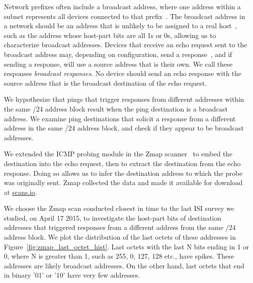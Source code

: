 Network prefixes often include a broadcast address, where one
address within a subnet represents all devices connected to
that prefix~\cite{rfc919}.
%
The broadcast address in a network should
be an address that is
unlikely to be assigned to a real host~\cite{rfc919}, such as the
address whose host-part bits are all 1s or 0s, allowing us to
characterize broadcast addresses.
%
Devices that receive an echo
request sent to the broadcast address may, depending on
configuration, send a response~\cite{rfc1122}, and if sending a response,
will use a source address that is their own.
%
We call these
responses \emph{broadcast responses}.  
%
No device should send
an echo response with the source address that is the
broadcast destination of the echo request. 

We hypothesize that pings that trigger responses from different
addresses within the same /24 address block result when the
ping destination is a broadcast address. 
We examine ping destinations
that solicit a response from a different address in the same /24
address block, and check if they appear to be broadcast addresses.
%
%
%
%

We extended the ICMP probing module in the
Zmap scanner~\cite{durumeric2013zmap} to embed the destination
into the echo request, then to extract the destination from the
echo response.
%
Doing so allows us to infer the destination address to which the probe
was originally sent.
%
%
Zmap collected the data and made
it available for download at \url{scans.io}.
%

We choose the Zmap scan conducted closest in
time to the last ISI survey we studied, on April 17 2015, to investigate
the host-part bits of destination addresses that triggered responses
from a different address from the same /24 address block.
%
We plot the distribution of the last octets of these addresses in
Figure~\ref{fig:zmap_last_octet_hist}.
%
Last octets with the last N bits ending in 1 or 0, where N is greater than 1,
such as 255, 0, 127, 128 etc., have spikes. These addresses are likely broadcast addresses.
On the other hand, last octets that
end in binary '01' or '10' have very few addresses.

